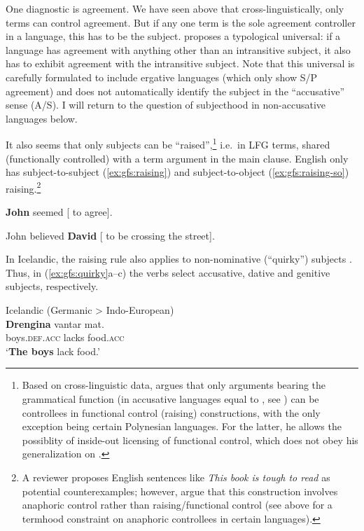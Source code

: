 \documentclass[output=paper]{../langscibook}
\begin{document}
 One diagnostic is agreement. We have seen above that cross-linguistically, only terms can control agreement. But if any one term is the sole agreement controller in a language, this has to be the subject. \citet[364]{moravcsik1978-agr} proposes a typological universal: if a language has agreement with anything other than an intransitive subject, it also has to exhibit agreement with the intransitive subject. Note that this universal is carefully formulated to include ergative languages (which only show S/P agreement) and does not automatically identify the subject in the ``accusative'' sense (A/S). I will return to the question of subjecthood in non-accusative languages below.
 
 It also seems that only subjects can be ``raised'',\footnote{Based on cross-linguistic data, \citet[155-161]{falk06} argues that only arguments bearing the grammatical function \PIVOT (in accusative languages equal to \SUBJ, see ) can be controllees in functional control (raising) constructions, with the only exception being certain Polynesian languages. For the latter, he allows the possiblity of inside-out licensing of functional control, which does not obey his generalization on \PIVOT.} i.e.\ in LFG terms, shared (functionally controlled) with a term argument in the main clause. English only has subject-to-subject (\ref{ex:gfs:raising}) and subject-to-object (\ref{ex:gfs:raising-so}) raising.\footnote{A reviewer proposes English sentences like \emph{This book is tough to read} as potential counterexamples; however, \citet{dalrympleking2000} argue that this construction involves anaphoric control rather than raising/functional control (see  above for a termhood constraint on anaphoric controllees in certain languages).}  
 
 \ea\label{ex:gfs:raising}
 \textbf{John} seemed \textup{[}{\GAP} to agree\textup{]}.
 
   \ex\label{ex:gfs:raising-so}
    John believed \textbf{David} \textup{[}{\GAP} to be crossing the street\textup{]}.
 \z
 
 In Icelandic, the raising rule also applies to non-nominative (``quirky'') subjects \citep{Andrews82}. Thus, in (\ref{ex:gfs:quirky}a--c) the verbs select accusative, dative and genitive subjects, respectively.
 
 \ea\label{ex:gfs:quirky}
 Icelandic (Germanic > Indo-European)\\
    \ea
    \gll \textbf{Drengina} vantar mat.\\
    boys.\textsc{def.acc} lacks food.\textsc{acc}\\
    \trans `\textbf{The boys} lack food.'
    
\end{document}
